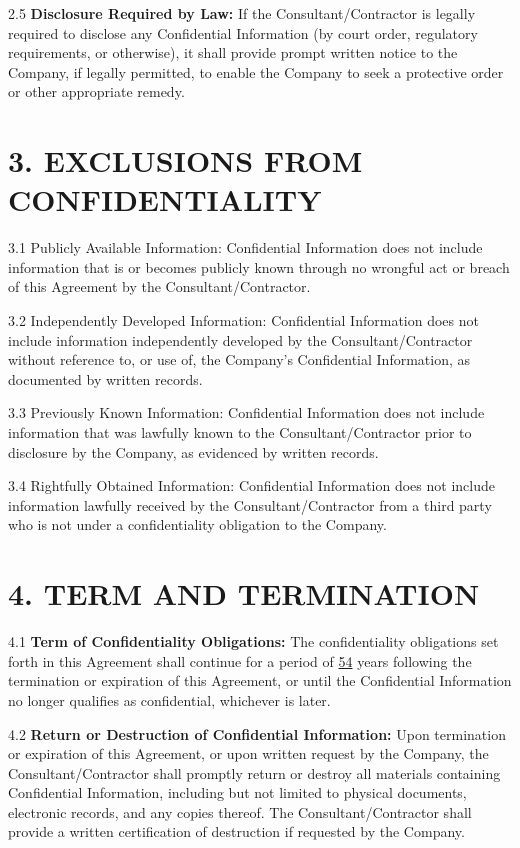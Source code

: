 \documentclass[12pt]{article}
\begin{document}
2.5 \textbf{Disclosure Required by Law:} If the Consultant/Contractor is legally required to disclose any Confidential Information (by court order, regulatory requirements, or otherwise), it shall provide prompt written notice to the Company, if legally permitted, to enable the Company to seek a protective order or other appropriate remedy.

\section*{3. EXCLUSIONS FROM CONFIDENTIALITY}

3.1 Publicly Available Information: Confidential Information does not include information that is or becomes publicly known through no wrongful act or breach of this Agreement by the Consultant/Contractor.

3.2 Independently Developed Information: Confidential Information does not include information independently developed by the Consultant/Contractor without reference to, or use of, the Company's Confidential Information, as documented by written records.

3.3 Previously Known Information: Confidential Information does not include information that was lawfully known to the Consultant/Contractor prior to disclosure by the Company, as evidenced by written records.

3.4 Rightfully Obtained Information: Confidential Information does not include information lawfully received by the Consultant/Contractor from a third party who is not under a confidentiality obligation to the Company.

\section*{4. TERM AND TERMINATION}

4.1 \textbf{Term of Confidentiality Obligations:} The confidentiality obligations set forth in this Agreement shall continue for a period of \underline{54} years following the termination or expiration of this Agreement, or until the Confidential Information no longer qualifies as confidential, whichever is later.

4.2 \textbf{Return or Destruction of Confidential Information:} Upon termination or expiration of this Agreement, or upon written request by the Company, the Consultant/Contractor shall promptly return or destroy all materials containing Confidential Information, including but not limited to physical documents, electronic records, and any copies thereof. The Consultant/Contractor shall provide a written certification of destruction if requested by the Company.
\end{document}
